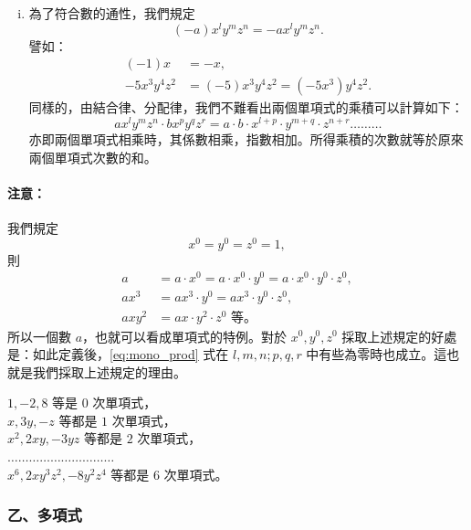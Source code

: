 \begin{enumerate}[(i)]
  \item 為了符合數的通性，我們規定
  \begin{equation*}
    (-a) x^l y^m z^n = -a x^l y^m z^n.
  \end{equation*}
  譬如：
  \begin{align*}
    (-1)x &= -x, \\
    -5x^3 y^4 z^2 &= (-5) x^3 y^4 z^2 = (-5x^3) y^4 z^2.
  \end{align*}
  同樣的，由結合律、分配律，我們不難看出兩個單項式的乘積可以計算如下：
  \begin{equation}\label{eq:mono_prod}
    a x^l y^m z^n \cdot b x^p y^q z^r = a \cdot b \cdot x^{l+p} \cdot y^{m+q} \cdot z^{n+r} \dots\dots\dots
  \end{equation}
  亦即兩個單項式相乘時，其係數相乘，指數相加。所得乘積的次數就等於原來兩個單項式次數的和。
\end{enumerate}

\paragraph{注意：}
我們規定
\begin{equation*}
  x^0 = y^0 = z^0 = 1,
\end{equation*}
則
\begin{align*}
  a &= a \cdot x^0 = a \cdot x^0 \cdot y^0 = a \cdot x^0 \cdot y^0 \cdot z^0, \\
  a x^3 &= a x^3 \cdot y^0 = a x^3 \cdot y^0 \cdot z^0, \\
  a x y^2 &= a x \cdot y^2 \cdot z^0 \text{ 等。}
\end{align*}
所以一個數 $a$，也就可以看成單項式的特例。對於 $x^0, y^0, z^0$ 採取上述規定的好處是：如此定義後，\eqref{eq:mono_prod} 式在 $l, m, n; p, q, r$ 中有些為零時也成立。這也就是我們採取上述規定的理由。

\begin{example}\label{ex:5-1-1}
$1, -2, 8$ 等是 $0$ 次單項式，\\
$x, 3y, -z$ 等都是 $1$ 次單項式，\\
$x^2, 2xy, -3yz$ 等都是 $2$ 次單項式，\\
$\dots\dots\dots\dots\dots\dots\dots\dots\dots\dots$\\
$x^6, 2x y^3 z^2, -8 y^2 z^4$ 等都是 $6$ 次單項式。
\end{example}

\subsubsection*{乙、多項式}\label{subsec:5-1-b}

